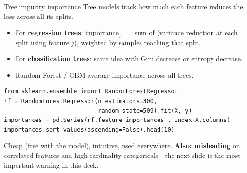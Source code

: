 \documentclass[aspectratio=169]{beamer}
\begin{document}
\begin{frame}[fragile]{Tree impurity importance}
  Tree models track how much each feature reduces the loss across all its splits.
  \vfill
  \begin{itemize}
    \item For \textbf{regression trees}: importance$_j$ $=$ sum of (variance reduction at each split using feature $j$), weighted by samples reaching that split.
    \item For \textbf{classification trees}: same idea with Gini decrease or entropy decrease.
    \item Random Forest / GBM average importance across all trees.
  \end{itemize}
  \vfill
{\lstset{basicstyle=\ttfamily\scriptsize}
\begin{lstlisting}
from sklearn.ensemble import RandomForestRegressor
rf = RandomForestRegressor(n_estimators=300,
                           random_state=509).fit(X, y)
importances = pd.Series(rf.feature_importances_, index=X.columns)
importances.sort_values(ascending=False).head(10)
\end{lstlisting}}
  \vfill
  Cheap (free with the model), intuitive, used everywhere. \textbf{Also: misleading} on correlated features and high-cardinality categoricals - the next slide is the most important warning in this deck.
\end{frame}
\end{document}
